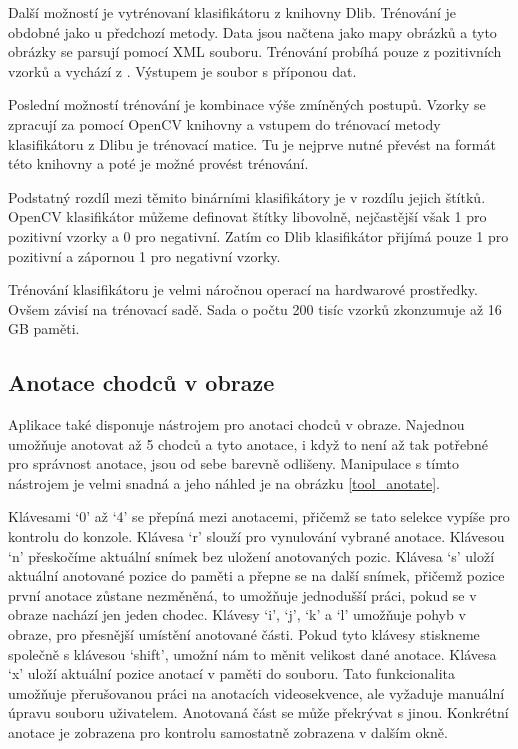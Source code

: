 Další možností je vytrénovaní klasifikátoru z knihovny Dlib. Trénování je obdobné jako u předchozí metody. Data jsou načtena jako mapy obrázků a tyto obrázky se parsují pomocí XML souboru. Trénování probíhá pouze z pozitivních vzorků a vychází z \cite{hog:dalal}. Výstupem je soubor s příponou dat.

Poslední možností trénování je kombinace výše zmíněných postupů. Vzorky se zpracují za pomocí OpenCV knihovny a vstupem do trénovací metody klasifikátoru z Dlibu je trénovací matice. Tu je nejprve nutné převést na formát této knihovny a poté je možné provést trénování.

Podstatný rozdíl mezi těmito binárními klasifikátory je v rozdílu jejich štítků. OpenCV klasifikátor můžeme definovat štítky libovolně, nejčastější však 1 pro pozitivní vzorky a 0 pro negativní. Zatím co Dlib klasifikátor přijímá pouze 1 pro pozitivní a zápornou 1 pro negativní vzorky.

Trénování klasifikátoru je velmi náročnou  operací na hardwarové prostředky. Ovšem závisí na trénovací sadě. Sada o počtu 200 tisíc vzorků zkonzumuje až 16 GB paměti.

\subsection{Anotace chodců v obraze}
Aplikace také disponuje nástrojem pro anotaci chodců v obraze. Najednou umožňuje anotovat až 5 chodců a tyto anotace, i když to není až tak potřebné pro správnost anotace, jsou od sebe barevně odlišeny. Manipulace s tímto nástrojem je velmi snadná a jeho náhled je na obrázku \ref{tool_anotate}.

Klávesami `0' až `4' se přepíná mezi anotacemi, přičemž se tato selekce vypíše pro kontrolu do konzole. Klávesa `r' slouží pro vynulování vybrané anotace. Klávesou `n' přeskočíme aktuální snímek bez uložení anotovaných pozic. Klávesa `s' uloží aktuální anotované pozice do paměti a přepne se na další snímek, přičemž pozice první anotace zůstane nezměněná, to umožňuje jednodušší práci, pokud se v obraze nachází jen jeden chodec. Klávesy `i', `j', `k' a `l' umožňuje pohyb v obraze, pro přesnější umístění anotované části. Pokud tyto klávesy stiskneme společně s klávesou `shift', umožní nám to měnit velikost dané anotace. Klávesa `x' uloží aktuální pozice anotací v paměti do souboru. Tato funkcionalita umožňuje přerušovanou práci na anotacích videosekvence, ale vyžaduje manuální úpravu souboru uživatelem. Anotovaná část se může překrývat s jinou. Konkrétní anotace je zobrazena pro kontrolu samostatně zobrazena v dalším okně.

